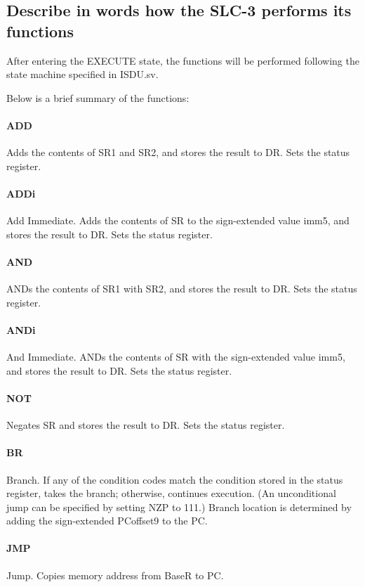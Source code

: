 \documentclass[11pt]{article}
\begin{document}
\subsection{Describe in words how the SLC-3 performs its functions}
After entering the EXECUTE state, the functions will be performed following the state machine specified in ISDU.sv.

Below is a brief summary of the functions:
\paragraph{ADD} Adds the contents of SR1 and SR2, and stores the result to DR. Sets the status register.
\paragraph{ADDi} Add Immediate. Adds the contents of SR to the sign-extended value imm5, and stores the result to DR. Sets the status register.

\paragraph{AND} ANDs the contents of SR1 with SR2, and stores the result to DR. Sets the status register.

\paragraph{ANDi} And Immediate. ANDs the contents of SR with the sign-extended value imm5, and stores the result to DR. Sets the status register.

\paragraph{NOT} Negates SR and stores the result to DR. Sets the status register.

\paragraph{BR} Branch. If any of the condition codes match the condition stored in the status register, takes the branch; otherwise, continues execution. (An unconditional jump can be specified by setting NZP to 111.) Branch location is determined by adding the sign-extended PCoffset9 to the PC.

\paragraph{JMP} Jump. Copies memory address from BaseR to PC.
\end{document}
